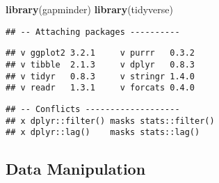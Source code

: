 \documentclass[]{article}
\title{}
\author{}
\date{}
\newenvironment{Shaded}{\begin{snugshade}}{\end{snugshade}}
\newcommand{\KeywordTok}[1]{\textcolor[rgb]{0.13,0.29,0.53}{\textbf{#1}}}
\newcommand{\NormalTok}[1]{#1}
\begin{document}
\begin{Shaded}
\begin{Highlighting}[]
\KeywordTok{library}\NormalTok{(gapminder)}
\KeywordTok{library}\NormalTok{(tidyverse)}
\end{Highlighting}
\end{Shaded}

\begin{verbatim}
## -- Attaching packages ----------
\end{verbatim}

\begin{verbatim}
## v ggplot2 3.2.1     v purrr   0.3.2
## v tibble  2.1.3     v dplyr   0.8.3
## v tidyr   0.8.3     v stringr 1.4.0
## v readr   1.3.1     v forcats 0.4.0
\end{verbatim}

\begin{verbatim}
## -- Conflicts -------------------
## x dplyr::filter() masks stats::filter()
## x dplyr::lag()    masks stats::lag()
\end{verbatim}

\hypertarget{data-manipulation}{%
\subsection{Data Manipulation}\label{data-manipulation}}
\end{document}
